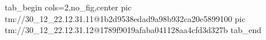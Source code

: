  
 
 
 
 

\qqSecOrig


\ifcmt
  tab_begin cols=2,no_fig,center
    pic tm://30_12_22.12.31.11@1b2d9538edad9a98b932ca20e5899100
    pic tm://30_12_22.12.31.12@1789f9019afaba041128aa4cfd3d327b
  tab_end
\fi

